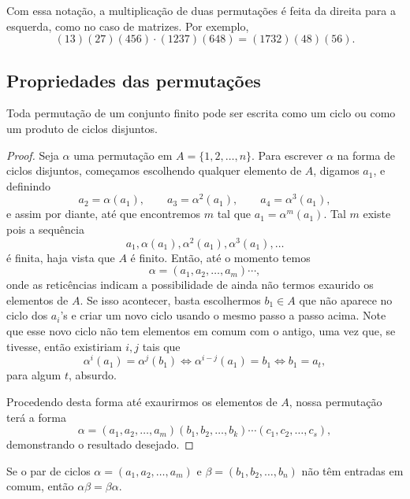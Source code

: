     Com essa notação, a multiplicação de duas permutações é feita da direita para a esquerda, como
    no caso de matrizes. Por exemplo,
    \[
    (13)(27)(456)\cdot (1237)(648) = (1732)(48)(56).
    \]
    \subsection*{Propriedades das permutações}
    \begin{theorem}
    \label{teo-prod-ciclos-disj}
        Toda permutação de um conjunto finito pode ser escrita como um ciclo ou
        como um produto de ciclos disjuntos.
    \end{theorem}
    \begin{proof}
        Seja $\alpha$ uma permutação em $A = \{1, 2, \dots, n\}$. Para escrever $\alpha$ na forma
        de ciclos disjuntos, começamos escolhendo qualquer elemento de $A$, digamos $a_1$, e definindo
        \[
        a_2 = \alpha(a_1), \qquad a_3 = \alpha^2(a_1), \qquad a_4 = \alpha^3(a_1),
        \]
        e assim por diante, até que encontremos $m$ tal que $a_1 = \alpha^m(a_1)$. Tal $m$ existe
        pois a sequência
        \[
        a_1, \alpha(a_1), \alpha^2(a_1), \alpha^3(a_1), \dots
        \]
        é finita, haja vista que $A$ é finito. Então, até o momento temos
        \[
        \alpha = (a_1, a_2, \dots, a_m)\cdots,
        \]
        onde as reticências indicam a possibilidade de ainda não termos exaurido os elementos de $A$.
        Se isso acontecer, basta escolhermos $b_1\in A$ que não aparece no ciclo dos $a_i$'s e criar
        um novo ciclo usando o mesmo passo a passo acima. Note que esse novo ciclo não tem elementos
        em comum com o antigo, uma vez que, se tivesse, então existiriam $i,j$ tais que
        \[
        \alpha^i(a_1) = \alpha^j(b_1) \iff \alpha^{i-j}(a_1) = b_1 \iff b_1 = a_t, 
        \]
        para algum $t$, absurdo. 
        
        Procedendo desta forma até exaurirmos os elementos de $A$, nossa permutação terá a forma
        \[
        \alpha = (a_1, a_2, \dots, a_m)(b_1, b_2, \dots, b_k)\cdots(c_1, c_2, \dots, c_s),
        \]
        demonstrando o resultado desejado.
    \end{proof}
    \begin{theorem}
    \label{teo-ciclos-disj-comutam}
        Se o par de ciclos $\alpha = (a_1, a_2, \dots, a_m)$ e $\beta = (b_1, b_2, \dots, b_n)$
        não têm entradas em comum, então $\alpha\beta = \beta\alpha$.
    \end{theorem}
